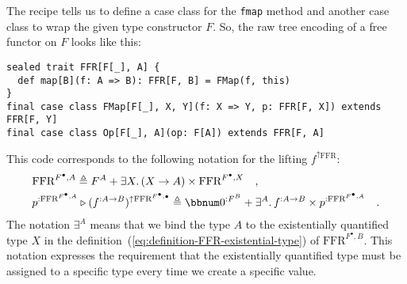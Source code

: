 The recipe tells us to define a case class for the \lstinline!fmap!
method and another case class to wrap the given type constructor $F$.
So, the raw tree encoding of a free functor on $F$ looks like this:
\begin{lstlisting}
sealed trait FFR[F[_], A] {
  def map[B](f: A => B): FFR[F, B] = FMap(f, this)
}
final case class FMap[F[_], X, Y](f: X => Y, p: FFR[F, X]) extends FFR[F, Y]
final case class Op[F[_], A](op: F[A]) extends FFR[F, A]
\end{lstlisting}
This code corresponds to the following notation for the lifting $f^{\uparrow\text{FFR}}$:
\begin{align}
 & \text{FFR}^{F^{\bullet},A}\triangleq F^{A}+\exists X.\,(X\rightarrow A)\times\text{FFR}^{F^{\bullet},X}\quad,\label{eq:definition-FFR-existential-type}\\
 & p^{:\text{FFR}^{F^{\bullet},A}}\triangleright(f^{:A\rightarrow B})^{\uparrow\text{FFR}^{F^{\bullet},\bullet}}\triangleq\bbnum 0^{:F^{B}}+\exists^{A}.\,f^{:A\rightarrow B}\times p^{:\text{FFR}^{F^{\bullet},A}}\quad.\nonumber 
\end{align}
The notation $\exists^{A}$ means that we bind the type $A$ to the
existentially quantified type $X$ in the definition~(\ref{eq:definition-FFR-existential-type})
of $\text{FFR}^{F^{\bullet},B}$. This notation expresses the requirement
that the existentially quantified type must be assigned to a specific
type every time we create a specific value.

